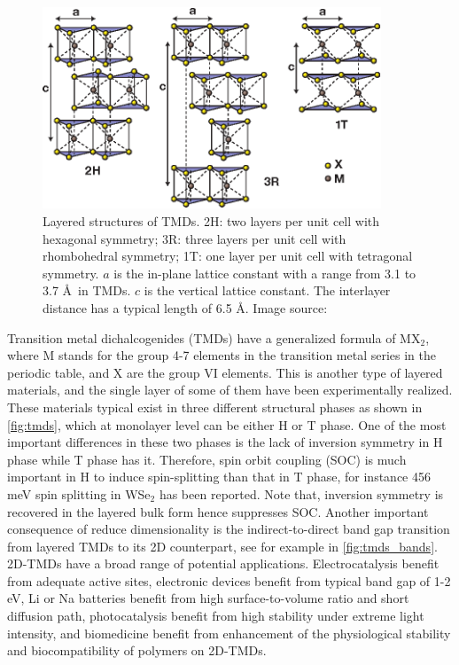 \begin{figure}[htbp!] 
\centering  
\includegraphics[width=0.9\textwidth]{tmds.eps}
\caption[Layered structures of TMDs]{Layered structures of TMDs. 2H: two layers per unit cell with hexagonal symmetry; 3R: three layers per unit cell with rhombohedral symmetry; 1T: one layer per unit cell with tetragonal symmetry. $a$ is the in-plane lattice constant with a range from 3.1 to 3.7 \AA~in TMDs. $c$ is the vertical lattice constant. The interlayer distance has a typical length of 6.5 \AA. Image source: \cite{Wang2012}}  
\label{fig:tmds}
\end{figure} 

Transition metal dichalcogenides (TMDs) have a generalized formula of MX$_2$, where M stands for the group 4-7 elements in the transition metal series in the periodic table, and X are the group VI elements. This is another type of layered materials, and the single layer of some of them have been experimentally realized.  These materials typical exist in three different structural phases as shown in \autoref{fig:tmds}, which at monolayer level can be either H or T phase. One of the most important differences in these two phases is the lack of inversion symmetry in H phase while T phase has it. Therefore, spin orbit coupling (SOC) is much important in H to induce spin-splitting than that in T phase, for instance 456 meV spin splitting in WSe$_2$\cite{Zhu2011giant} has been reported. Note that, inversion symmetry is recovered in the layered bulk form hence suppresses SOC. Another important consequence of reduce dimensionality is the indirect-to-direct band gap transition from layered TMDs to its 2D counterpart, see for example in \autoref{fig:tmds_bands}. 2D-TMDs have a broad range of potential applications. Electrocatalysis\cite{kim2013enhanced,huang2014synthesis} benefit from adequate active sites, electronic devices\cite{RadisavljevicB2011,sun2014fabrication} benefit from typical band gap of 1-2 eV, Li or Na batteries\cite{chang2011cysteine,chen2013situ} benefit from high surface-to-volume ratio and short diffusion path, photocatalysis benefit from high stability under extreme light intensity\cite{Li2013,Parzinger2015}, and biomedicine benefit from enhancement of the physiological stability and biocompatibility of polymers on 2D-TMDs\cite{Cheng2014,Yin2014}. 




